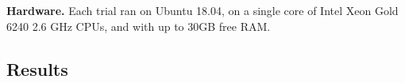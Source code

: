 \noindent \textbf{Hardware.} Each trial ran on Ubuntu 18.04, on a single core
of Intel Xeon Gold 6240 2.6 GHz CPUs, and with up to 30GB free RAM.


 
\subsection{Results}
\label{exp-results}


